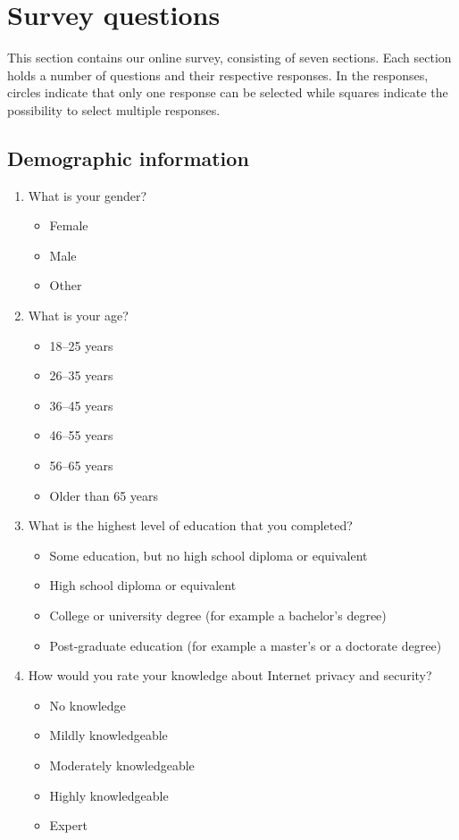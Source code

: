 \section{Survey questions}
This section contains our online survey, consisting of seven sections.  Each
section holds a number of questions and their respective responses.  In the
responses, circles indicate that only one response can be selected while squares
indicate the possibility to select multiple responses.

\subsection{Demographic information}
\begin{enumerate}
    \item What is your gender?
        \begin{itemize}[label=$\Circle$]
            \item Female
            \item Male
            \item Other
        \end{itemize}

    \item What is your age?
        \begin{itemize}[label=$\Circle$]
            \item 18--25 years
            \item 26--35 years
            \item 36--45 years
            \item 46--55 years
            \item 56--65 years
            \item Older than 65 years
        \end{itemize}

    \item What is the highest level of education that you completed?
        \begin{itemize}[label=$\Circle$]
            \item Some education, but no high school diploma or equivalent
            \item High school diploma or equivalent
            \item College or university degree (for example a bachelor's degree)
            \item Post-graduate education (for example a master's or a doctorate degree)
        \end{itemize}

    \item How would you rate your knowledge about Internet privacy and security?
        \begin{itemize}[label=$\Circle$]
            \item No knowledge
            \item Mildly knowledgeable
            \item Moderately knowledgeable
            \item Highly knowledgeable
            \item Expert
        \end{itemize}
\end{enumerate}

